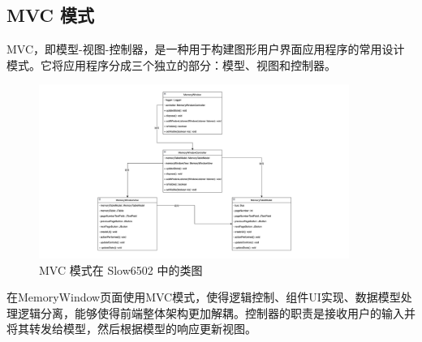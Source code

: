 \subsection{MVC 模式}

MVC，即模型-视图-控制器，是一种用于构建图形用户界面应用程序的常用设计模式。它将应用程序分成三个独立的部分：模型、视图和控制器。

\begin{figure}[htb]
  \centering
  \includegraphics[width=0.9\textwidth]{figures/MVC模式.jpg}
  \caption{MVC 模式在 Slow6502 中的类图}
\end{figure}

在MemoryWindow页面使用MVC模式，使得逻辑控制、组件UI实现、数据模型处理逻辑分离，能够使得前端整体架构更加解耦。控制器的职责是接收用户的输入并将其转发给模型，然后根据模型的响应更新视图。

